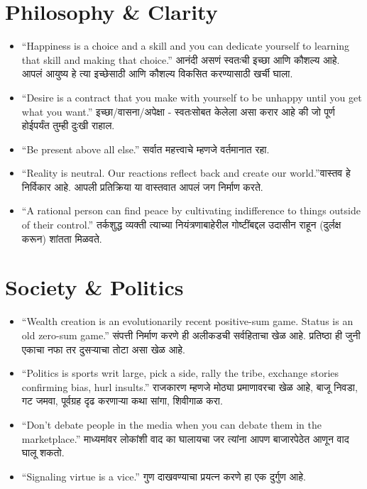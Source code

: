 \section*{Philosophy \& Clarity}
\begin{itemize}
    \item ``Happiness is a choice and a skill and you can dedicate yourself to learning that skill and making that choice.'' आनंदी असणं स्वतःची इच्छा आणि कौशल्य आहे. आपलं आयुष्य हे त्या इच्छेसाठी आणि कौशल्य विकसित करण्यासाठी खर्ची घाला.

    \item ``Desire is a contract that you make with yourself to be unhappy until you get what you want.'' इच्छा/वासना/अपेक्षा - स्वतःसोबत केलेला असा करार आहे की जो पूर्ण होईपर्यंत तुम्ही दुःखी राहाल.

    \item ``Be present above all else.'' सर्वात महत्त्वाचे म्हणजे वर्तमानात रहा.

    \item ``Reality is neutral. Our reactions reflect back and create our world.''वास्तव हे निर्विकार आहे. आपली प्रतिक्रिया या वास्तवात आपलं जग निर्माण करते.

    \item ``A rational person can find peace by cultivating indifference to things outside of their control.'' तर्कशुद्ध व्यक्ती त्याच्या नियंत्रणाबाहेरील गोष्टींबद्दल उदासीन राहून (दुर्लक्ष करून) शांतता मिळवते.
\end{itemize}

\section*{Society \& Politics}
\begin{itemize}
    \item ``Wealth creation is an evolutionarily recent positive-sum game. Status is an old zero-sum game.'' संपत्ती निर्माण करणे ही अलीकडची सर्वहिताचा खेळ आहे. प्रतिष्ठा ही जुनी एकाचा नफा तर दुसऱ्याचा तोटा असा खेळ आहे.

    \item ``Politics is sports writ large, pick a side, rally the tribe, exchange stories confirming bias, hurl insults.'' राजकारण म्हणजे मोठ्या प्रमाणावरचा खेळ आहे, बाजू निवडा, गट जमवा, पूर्वग्रह दृढ करणाऱ्या कथा सांगा, शिवीगाळ करा.

    \item ``Don’t debate people in the media when you can debate them in the marketplace.'' माध्यमांवर लोकांशी वाद का घालायचा जर त्यांना आपण बाजारपेठेत आणून वाद घालू शकतो.

    \item ``Signaling virtue is a vice.'' गुण दाखवण्याचा प्रयत्न करणे हा एक दुर्गुण आहे.
\end{itemize}


